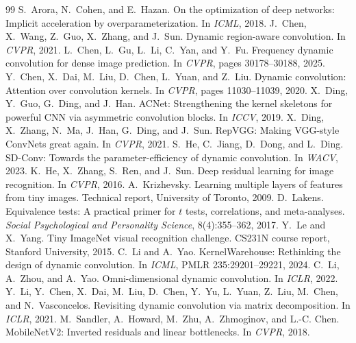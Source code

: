 \documentclass[10pt,a4paper]{article}
\begin{document}
\FloatBarrier
\begin{thebibliography}{99}\small
{} S.~Arora, N.~Cohen, and E.~Hazan. On the optimization of deep networks: Implicit acceleration by overparameterization. In \emph{ICML}, 2018.
 J.~Chen, X.~Wang, Z.~Guo, X.~Zhang, and J.~Sun. Dynamic region-aware convolution. In \emph{CVPR}, 2021.
 L.~Chen, L.~Gu, L.~Li, C.~Yan, and Y.~Fu. Frequency dynamic convolution for dense image prediction. In \emph{CVPR}, pages 30178--30188, 2025.
 Y.~Chen, X.~Dai, M.~Liu, D.~Chen, L.~Yuan, and Z.~Liu. Dynamic convolution: Attention over convolution kernels. In \emph{CVPR}, pages 11030--11039, 2020.
 X.~Ding, Y.~Guo, G.~Ding, and J.~Han. ACNet: Strengthening the kernel skeletons for powerful CNN via asymmetric convolution blocks. In \emph{ICCV}, 2019.
 X.~Ding, X.~Zhang, N.~Ma, J.~Han, G.~Ding, and J.~Sun. RepVGG: Making VGG-style ConvNets great again. In \emph{CVPR}, 2021.
 S.~He, C.~Jiang, D.~Dong, and L.~Ding. SD-Conv: Towards the parameter-efficiency of dynamic convolution. In \emph{WACV}, 2023.
 K.~He, X.~Zhang, S.~Ren, and J.~Sun. Deep residual learning for image recognition. In \emph{CVPR}, 2016.
 A.~Krizhevsky. Learning multiple layers of features from tiny images. Technical report, University of Toronto, 2009.
 D.~Lakens. Equivalence tests: A practical primer for $t$ tests, correlations, and meta-analyses. \emph{Social Psychological and Personality Science}, 8(4):355--362, 2017.
 Y.~Le and X.~Yang. Tiny ImageNet visual recognition challenge. CS231N course report, Stanford University, 2015.
 C.~Li and A.~Yao. KernelWarehouse: Rethinking the design of dynamic convolution. In \emph{ICML}, PMLR 235:29201--29221, 2024.
 C.~Li, A.~Zhou, and A.~Yao. Omni-dimensional dynamic convolution. In \emph{ICLR}, 2022.
 Y.~Li, Y.~Chen, X.~Dai, M.~Liu, D.~Chen, Y.~Yu, L.~Yuan, Z.~Liu, M.~Chen, and N.~Vasconcelos. Revisiting dynamic convolution via matrix decomposition. In \emph{ICLR}, 2021.
 M.~Sandler, A.~Howard, M.~Zhu, A.~Zhmoginov, and L.-C. Chen. MobileNetV2: Inverted residuals and linear bottlenecks. In \emph{CVPR}, 2018.

\end{thebibliography}
\end{document}
